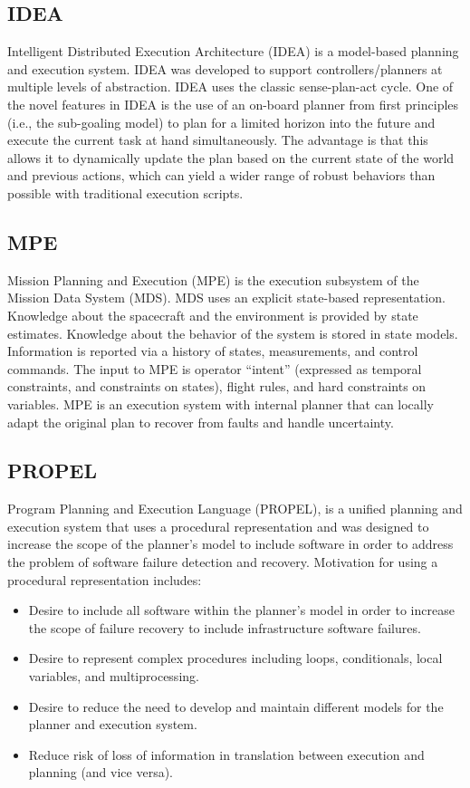 \documentclass[conference]{IEEEtran}
\begin{document}
\subsection{\textbf{IDEA}}\label{sec:idea}
Intelligent Distributed Execution Architecture (IDEA) is a model-based planning and execution system. IDEA was developed to support controllers/planners at multiple levels of abstraction. IDEA uses the classic sense-plan-act cycle. One of the novel features in IDEA is the use of an on-board planner from first principles (i.e., the sub-goaling model) to plan for a limited horizon into the future and execute the current task at hand simultaneously. The advantage is that this allows it to dynamically update the plan based on the current state of the world and previous actions, which can yield a wider range of robust behaviors than possible with traditional execution scripts.


\subsection{\textbf{MPE}}\label{sec:mpe}
Mission Planning and Execution (MPE) is the execution subsystem of the Mission Data System (MDS). MDS uses an explicit state-based representation. Knowledge about the spacecraft and the environment is provided by state estimates. Knowledge about the behavior of the system is stored in state models. Information is reported via a history of states, measurements, and control commands. The input to MPE is operator “intent” (expressed as temporal constraints, and constraints on states), flight rules, and hard constraints on variables. MPE is an execution system with internal planner that can locally adapt the original plan to recover from faults and handle uncertainty.

\subsection{\textbf{PROPEL}}\label{sec:propel}
Program Planning and Execution Language (PROPEL), is a unified planning and execution system that uses a procedural representation and was designed to increase the scope of the planner’s model to include software in order to address the problem of software failure detection and recovery. Motivation for using a procedural representation includes:
\begin{itemize}
    \item Desire to include all software within the planner’s model in order to increase the scope of failure recovery to include infrastructure software failures.
    \item Desire to represent complex procedures including loops, conditionals, local variables, and multiprocessing.
    \item Desire to reduce the need to develop and maintain different models for the planner and execution system.
    \item Reduce risk of loss of information in translation between execution and planning (and vice versa).
\end{itemize}
\end{document}
